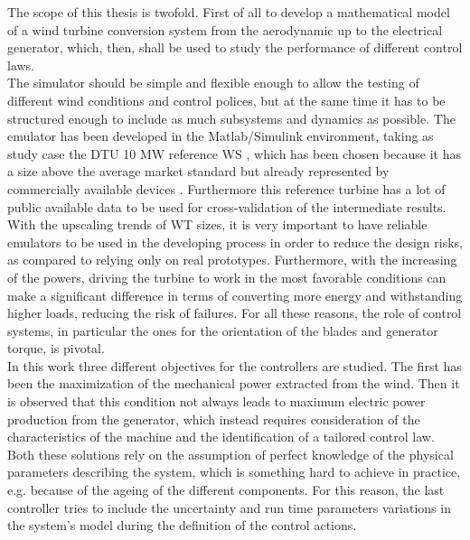 The scope of this thesis is twofold. First of all to develop a mathematical model of a wind turbine conversion system from the aerodynamic up to the electrical generator, which, then, shall be used to study the performance of different control laws.\\
The simulator should be simple and flexible enough to allow the testing of different wind conditions and control polices, but at the same time it has to be structured enough to include as much subsystems and dynamics as possible. The emulator has been developed in the Matlab/Simulink environment, taking as study case the DTU 10 MW reference \acrfull{WS} \cite{DTU_Wind_Energy_Report-I-0092}, which has been chosen because it has a size above the average market standard but already represented by commercially available devices \cite{wind_europe_data_2022}. Furthermore this reference turbine has a lot of public available data to be used for cross-validation of the intermediate results.\\
With the upscaling trends of \acrfull{WT} sizes, it is very important to have reliable emulators to be used in the developing process in order to reduce the design risks, as compared to relying only on real prototypes. Furthermore, with the increasing of the powers, driving the turbine to work in the most favorable conditions can make a significant difference in terms of converting more energy and withstanding higher loads, reducing the risk of failures. For all these reasons, the role of control systems, in particular the ones for the orientation of the blades and generator torque, is pivotal.\\
 In this work three different objectives for the controllers are studied. The first has been the maximization of the mechanical power extracted from the wind. Then it is observed that this condition not always leads to maximum electric power production from the generator, which instead requires consideration of the characteristics of the machine and the identification of a tailored control law. Both these solutions rely on the assumption of perfect knowledge of the physical parameters describing the system, which is something hard to achieve in practice, e.g. because of the ageing of the different components. For this reason, the last controller tries to include the uncertainty and run time parameters variations in the system's model during the definition of the control actions.  

